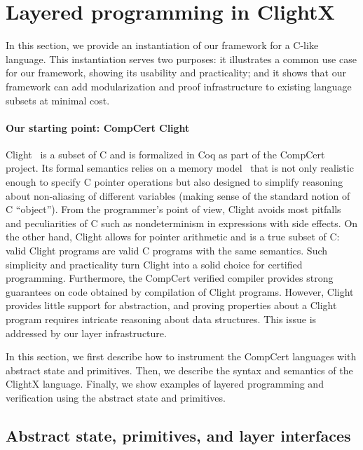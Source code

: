 \section{Layered programming in ClightX}
\label{sec:seq:clight}

In this section, we provide an instantiation of our framework for a
C-like language. This instantiation serves two purposes: it
illustrates a common use case for our framework, showing its usability
and practicality; and it shows that our framework can add
modularization and proof infrastructure to existing language subsets
at minimal cost.

\paragraph{Our starting point: CompCert Clight}

Clight~\cite{blazy-leroy-clight} is a subset of C and is
formalized in Coq as part of the CompCert project.  Its formal
semantics relies on a memory model~\cite{leroy08} that is not only
realistic enough to specify C pointer operations but also designed to
simplify reasoning about non-aliasing of different
variables (making sense of the standard notion of C ``object'').
From the programmer's point of view, 
Clight avoids most pitfalls and peculiarities of C such
as nondeterminism in expressions with side effects. 
On the other hand,
Clight allows for pointer arithmetic and is a true subset of C: valid
Clight programs are valid C programs with the same semantics.
Such
simplicity and practicality turn Clight into a solid choice for
certified programming.
Furthermore,
the CompCert verified compiler
provides strong guarantees on code
obtained by compilation of Clight programs.
However, Clight provides little support for abstraction,
and proving properties
about a Clight program requires intricate reasoning about
data structures. This issue is addressed by our layer infrastructure.


In this section, we first describe how to instrument the CompCert
languages with abstract state and primitives. Then, we describe the
syntax and semantics of the ClightX language. Finally, we show
examples of layered programming and verification using the abstract
state and primitives.

\subsection{Abstract state, primitives, and layer interfaces}

